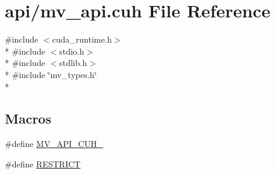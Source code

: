 \hypertarget{mv__api_8cuh}{}\section{api/mv\+\_\+api.cuh File Reference}
\label{mv__api_8cuh}
{\ttfamily \#include $<$cuda\+\_\+runtime.\+h$>$}\\*
{\ttfamily \#include $<$stdio.\+h$>$}\\*
{\ttfamily \#include $<$stdlib.\+h$>$}\\*
{\ttfamily \#include \char`\"{}mv\+\_\+types.\+h\char`\"{}}\\*
\subsection*{Macros}
\begin{DoxyCompactItemize}
\item 
\#define \hyperlink{mv__api_8cuh_a08663feadd063c016866654d18c7ae65}{M\+V\+\_\+\+A\+P\+I\+\_\+\+C\+U\+H\+\_\+}
\item 
\#define \hyperlink{mv__api_8cuh_aae3356b63849abbe8789dd41648ee90a}{R\+E\+S\+T\+R\+I\+C\+T}
\end{DoxyCompactItemize}
